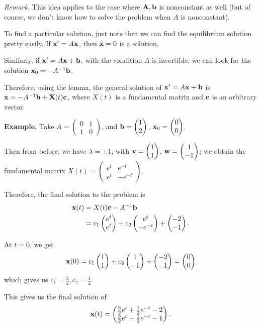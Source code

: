 \documentclass{article}
\newcommand{\mat}[1]{\begin{pmatrix}#1\end{pmatrix}}
\begin{document}
{\it Remark.} This idea applies to the case where $\mathbf{A}, \mathbf{b}$ is nonconstant as well (but of course, we don't know how to solve the problem when $A$ is nonconstant).

To find a particular solution, just note that we can find the equilibrium solution pretty easily.  If $\mathbf{x}' = A \mathbf{x}$, then $\mathbf{x} =  0$ is a solution.

Simliarly, if $\mathbf{x}' = A \mathbf{x} + \mathbf{b}$, with the condition $A$ is invertible, we can look for the solution $\mathbf{x}_0 =- A^{-1} \mathbf{b}$.

Therefore, using the lemma, the general solution of $\mathbf{x}' = A \mathbf{x} + \mathbf{b}$ is  $\mathbf{x} = - A^{-1} \mathbf{b} + \mathbf{X}(t) \mathbf{c}$, where $X(t)$ is a fundamental matrix and $\mathbf{c}$ is an arbitrary vector.

{\bf Example.} Take $A = \mat{0 & 1 \\ 1 & 0}$, and $\mbf{b} = \mat{1 \\ 2}$, $\mbf{x}_0 = \mat{0 \\ 0}$.

Then from before, we have $\lambda = \pm 1$, with $\mbf{v} = \mat{1 \\ 1}$, $\mbf{w} = \mat{1 \\ -1}$; we obtain the fundamental matrix $X(t) = \mat{e^t & e^{-t} \\ e^t & - e^{-t}}$.

Therefore, the final solution to the problem is
\begin{align*}
  \mbf{x}(t) &= X(t) \mbf{c} - A^{-1} \mbf{b} \\
  &= c_1 \mat{e^t \\ e^t} + c_2 \mat{e^{t} \\ - e^{-t}} + \mat{-2 \\ -1}.
\end{align*}

At $t = 0$, we get
\begin{align*}
  \mbf{x}(0) = c_1 \mat{1 \\ 1} + c_2 \mat{1 \\ - 1} + \mat{-2 \\ -1} = \mat{0 \\ 0}
\end{align*}
which  gives us $c_1 = \frac{3}{2}, c_2 = \frac{1}{2}$.

This gives us the final solution of
\begin{align*}
  \mbf{x}(t) = \mat{\frac{3}{2} e^ t+ \frac{1}{2}e^{-t} -2 \\ \frac{3}{2} e^t - \frac{1}{2} e^{-t} - 1 }.
\end{align*}
\end{document}

